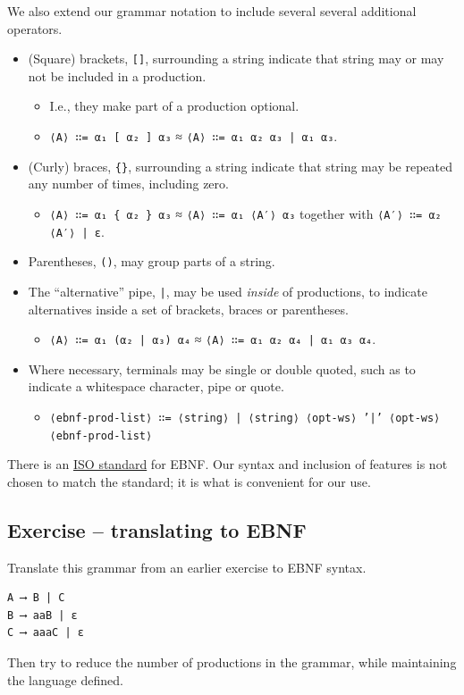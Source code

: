 \documentclass[11pt]{article}
\theoremstyle{definition}
\begin{document}
We also extend our grammar notation to include several
several additional operators.
\begin{itemize}
\item (Square) brackets, \texttt{[]}, surrounding a string
indicate that string may or may not be included in a production.
\begin{itemize}
\item I.e., they make part of a production optional.
\item \texttt{⟨A⟩ ∷= α₁ [ α₂ ] α₃} ≈ \texttt{⟨A⟩ ∷= α₁ α₂ α₃ | α₁ α₃}.
\end{itemize}
\item (Curly) braces, \texttt{\{\}}, surrounding a string
indicate that string may be repeated any number of times,
including zero.
\begin{itemize}
\item \texttt{⟨A⟩ ∷= α₁ \{ α₂ \} α₃} ≈ \texttt{⟨A⟩ ∷= α₁ ⟨A′⟩ α₃} together
with \texttt{⟨A′⟩ ∷= α₂ ⟨A′⟩ | ε}.
\end{itemize}
\item Parentheses, \texttt{()}, may group parts of a string.
\item The “alternative” pipe, \texttt{|}, may be used \emph{inside} of productions,
to indicate alternatives inside a set of brackets, braces
or parentheses.
\begin{itemize}
\item \texttt{⟨A⟩ ∷= α₁ (α₂ | α₃) α₄} ≈ \texttt{⟨A⟩ ∷= α₁ α₂ α₄ | α₁ α₃ α₄}.
\end{itemize}
\item Where necessary, terminals may be single or double quoted,
such as to indicate a whitespace character, pipe or quote.
\begin{itemize}
\item \texttt{⟨ebnf-prod-list⟩ ∷= ⟨string⟩ | ⟨string⟩ ⟨opt-ws⟩ '|' ⟨opt-ws⟩ ⟨ebnf-prod-list⟩}
\end{itemize}
\end{itemize}

There is an \href{https://www.iso.org/standard/26153.html}{ISO standard} for EBNF.
Our syntax and inclusion of features is
not chosen to match the standard;
it is what is convenient for our use.

\subsection{Exercise – translating to EBNF}
\label{sec:orgbc94c82}

Translate this grammar from an earlier exercise to EBNF syntax.
\begin{verbatim}
A ⟶ B | C
B ⟶ aaB | ε
C ⟶ aaaC | ε
\end{verbatim}
Then try to reduce the number of productions in the grammar,
while maintaining the language defined.
\end{document}
